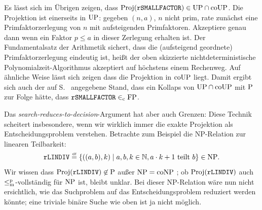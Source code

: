 Es lässt sich im Übrigen zeigen, dass $\Proj(\mathtt{rSMALLFACTOR})\in\UP\cap\coUP$.
Die Projektion ist einerseits in $\UP$: gegeben $(n, a)$, $n$ nicht prim, rate zunächst eine Primfaktorzerlegung von $n$ mit aufsteigenden Primfaktoren. Akzeptiere genau dann wenn ein Faktor $p\leq a$ in dieser Zerlegung erhalten ist. Der Fundamentalsatz der Arithmetik sichert, dass die (aufsteigend geordnete) Primfaktorzerlegung eindeutig ist, heißt der oben skizzierte nichtdeterministische Polynomialzeit-Algorithmus akzeptiert auf höchstens einem Rechenweg.
Auf ähnliche Weise lässt sich zeigen dass die Projektion in $\coUP$ liegt.
Damit ergibt sich auch der auf S.~\pageref{label:lösbarkeit} angegebene Stand, dass ein Kollaps von $\UP\cap\coUP$ mit $\P$ zur Folge hätte, dass $\mathtt{rSMALLFACTOR}\inc\FP$.





Das \emph{search-reduces-to-decision}-Argument hat aber auch Grenzen:
Diese Technik scheitert insbesondere, wenn wir wirklich immer die exakte Projektion als Entscheidungsproblem verstehen. Betrachte zum Beispiel die NP-Relation zur linearen Teilbarkeit:
\[ \mathtt{rLINDIV} \defeq \{ ((a, b), k) \mid a,b,k\in\mathbb N, a\cdot k + 1\text{ teilt } b\} \in\NP. \]
Wir wissen dass $\Proj(\mathtt{rLINDIV})\not\in \P$ außer $\NP=\coNP$ \parencite{adleman_reducibility_1977}; ob $\Proj(\mathtt{rLINDIV})$ auch $\leqmp$-vollständig für $\NP$ ist, bleibt unklar.
Bei dieser NP-Relation wäre nun nicht ersichtlich, wie das Suchproblem auf das Entscheidungsproblem reduziert werden könnte; eine triviale binäre Suche wie oben ist ja nicht möglich.

